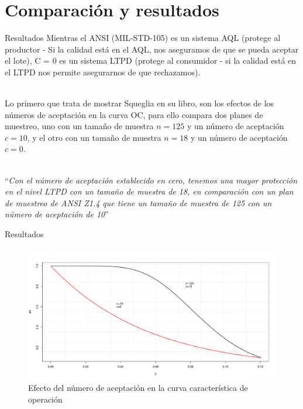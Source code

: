 \documentclass[10pt]{beamer}
\begin{document}
\section{Comparación y resultados}
\begin{frame}{Resultados}
Mientras el ANSI (MIL-STD-105) es un sistema AQL (protege al productor - Si la calidad está en el AQL, nos aseguramos de que se pueda aceptar el lote), C = 0 es un sistema LTPD (protege al consumidor - si la calidad está en el LTPD nos permite asegurarnos de que rechazamos).

~\\Lo primero que trata de mostrar Squeglia en su libro, son los efectos de los números de aceptación en la curva OC, para ello compara dos planes de muestreo, uno con un tamaño de muestra $n=125$ y un número de aceptación $c=10$, y el otro con un tamaño de muestra $n=18$ y un número de aceptación $c=0$.

~\\``\textit{Con el número de aceptación establecido en cero, tenemos una mayor protección en el nivel LTPD con un tamaño de muestra de 18, en comparación con un plan de muestreo de ANSI Z1.4 que tiene un tamaño de muestra de 125 con un número de aceptación de 10}''
\end{frame}

\begin{frame}{Resultados}
\begin{figure}[h!]
  \centering
  \includegraphics[scale=0.33]{FigurasUV/Figura2.pdf}
  \caption{Efecto del número de aceptación en la curva característica de operación}
\end{figure}
\end{frame}
\end{document}

